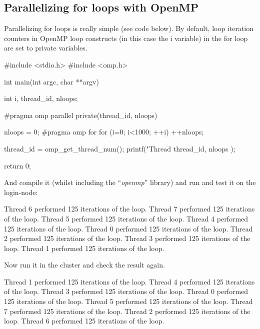 \subsection{Parallelizing for loops with OpenMP}

Parallelizing for loops is really simple (see code below). By default, loop
iteration counters in OpenMP loop constructs (in this case the i variable) in
the for loop are set to private variables.

\begin{prompt}
#include <stdio.h>
#include <omp.h>

int main(int argc, char **argv)
{
  int i, thread_id, nloops;

#pragma omp parallel private(thread\_id, nloops)
  {
    nloops = 0;
#pragma omp for
    for (i=0; i<1000; ++i)
   {
         ++nloops;
   }

    thread_id = omp_get_thread_num();
    printf("Thread %
           thread_id, nloops );
  }
  return 0;
}
\end{prompt}

And compile it (whilst including the ``\emph{openmp}'' library) and run and test it on the login-node:

\begin{prompt}
Thread 6 performed 125 iterations of the loop.
Thread 7 performed 125 iterations of the loop.
Thread 5 performed 125 iterations of the loop.
Thread 4 performed 125 iterations of the loop.
Thread 0 performed 125 iterations of the loop.
Thread 2 performed 125 iterations of the loop.
Thread 3 performed 125 iterations of the loop.
Thread 1 performed 125 iterations of the loop.
\end{prompt}

Now run it in the cluster and check the result again.

\begin{prompt}
Thread 1 performed 125 iterations of the loop.
Thread 4 performed 125 iterations of the loop.
Thread 3 performed 125 iterations of the loop.
Thread 0 performed 125 iterations of the loop.
Thread 5 performed 125 iterations of the loop.
Thread 7 performed 125 iterations of the loop.
Thread 2 performed 125 iterations of the loop.
Thread 6 performed 125 iterations of the loop.
\end{prompt}

